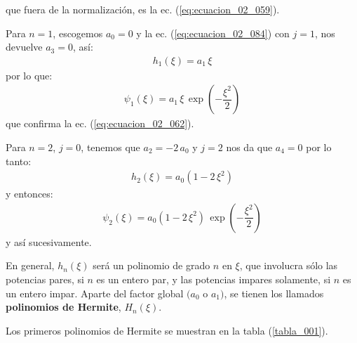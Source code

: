 \documentclass[12pt]{article}
\numberwithin{equation}{section}
\begin{document}
que fuera de la normalización, es la ec. (\ref{eq:ecuacion_02_059}).
\par
Para $n=1$, escogemos $a_{0} = 0$ y la ec. (\ref{eq:ecuacion_02_084}) con $j = 1$, nos devuelve $a_{3} = 0$, así:
\begin{align*}
h_{1} (\xi) = a_{1} \, \xi
\end{align*}
por lo que:
\begin{align*}
\psi_{1} (\xi) = a_{1} \, \xi \, \exp \left( - \dfrac{\xi^{2}}{2} \right)
\end{align*}
que confirma la ec. (\ref{eq:ecuacion_02_062}).
\par
Para $n = 2$, $j = 0$, tenemos que $a_{2} = - 2 \, a_{0}$ y $j = 2$ nos da que $a_{4} = 0$ por lo tanto:
\begin{align*}
h_{2} (\xi) = a_{0} (1 - 2 \, \xi^{2})
\end{align*}
y entonces:
\begin{align*}
\psi_{2} (\xi) = a_{0} (1 - 2 \, \xi^{2}) \, \exp \left( - \dfrac{\xi^{2}}{2} \right)
\end{align*}
y así sucesivamente.
\par
En general, $h_{n} (\xi)$ será un polinomio de grado $n$ en $\xi$, que involucra sólo las potencias pares, si $n$ es un entero par, y las potencias impares solamente, si $n$ es un entero impar. Aparte del factor global $(a_{0}$ o $a_{1})$, se tienen los llamados \textbf{polinomios de Hermite}, $H_{n} (\xi)$.
\par
Los primeros polinomios de Hermite se muestran en la tabla (\ref{tabla_001}). 
\end{document}
